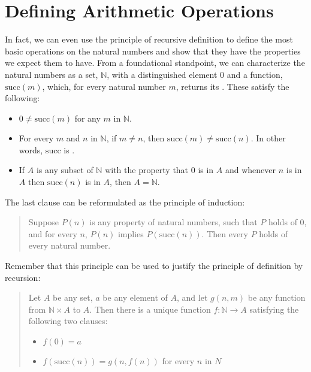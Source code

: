 \documentclass[letterpaper,10pt,english]{sphinxmanual}
\begin{document}
\section{Defining Arithmetic Operations}
\label{\detokenize{the_natural_numbers_and_induction:defining-arithmetic-operations}}\label{\detokenize{the_natural_numbers_and_induction:id3}}
\sphinxAtStartPar
In fact, we can even use the principle of recursive definition to define the most basic operations on the natural numbers and show that they have the properties we expect them to have. From a foundational standpoint, we can characterize the natural numbers as a set, \(\mathbb{N}\), with a distinguished element \(0\) and a function, \(\mathrm{succ}(m)\), which, for every natural number \(m\), returns its . These satisfy the following:
\begin{itemize}
\item {} 
\sphinxAtStartPar
\(0 \neq \mathrm{succ}(m)\) for any \(m\) in \(\mathbb{N}\).

\item {} 
\sphinxAtStartPar
For every \(m\) and \(n\) in \(\mathbb{N}\), if \(m \neq n\), then \(\mathrm{succ}(m) \neq \mathrm{succ}(n)\). In other words, \(\mathrm{succ}\) is .

\item {} 
\sphinxAtStartPar
If \(A\) is any subset of \(\mathbb{N}\) with the property that \(0\) is in \(A\) and whenever \(n\) is in \(A\) then \(\mathrm{succ}(n)\) is in \(A\), then \(A = \mathbb{N}\).

\end{itemize}

\sphinxAtStartPar
The last clause can be reformulated as the principle of induction:
\begin{quote}

\sphinxAtStartPar
Suppose \(P(n)\) is any property of natural numbers, such that \(P\) holds of \(0\), and for every \(n\), \(P(n)\) implies \(P(\mathrm{succ}(n))\). Then every \(P\) holds of every natural number.
\end{quote}

\sphinxAtStartPar
Remember that this principle can be used to justify the principle of definition by recursion:
\begin{quote}

\sphinxAtStartPar
Let \(A\) be any set, \(a\) be any element of \(A\), and let \(g(n,m)\) be any function from \(\mathbb{N} \times A\) to \(A\). Then there is a unique function \(f: \mathbb{N} \to A\) satisfying the following two clauses:
\begin{itemize}
\item {} 
\sphinxAtStartPar
\(f(0) = a\)

\item {} 
\sphinxAtStartPar
\(f(\mathrm{succ}(n)) = g(n,f(n))\) for every \(n\) in \(N\)

\end{itemize}
\end{quote}
\end{document}
